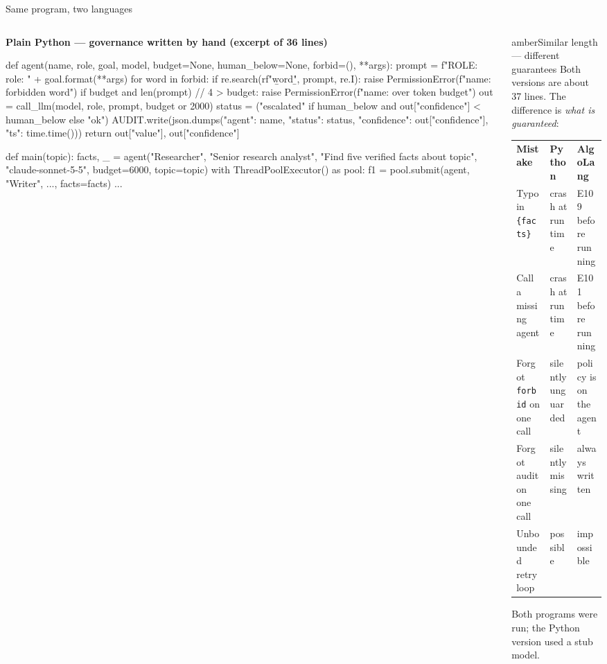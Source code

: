 \documentclass[aspectratio=169,11pt]{beamer}
\begin{document}
\begin{frame}[fragile]{Same program, two languages}
\begin{columns}[T]
\begin{column}{0.53\textwidth}
{\scriptsize\bfseries\color{muted} Plain Python — governance written by hand (excerpt of 36 lines)}
\begin{pycode}[listing options={style=py,basicstyle=\ttfamily\fontsize{5.6}{6.6}\selectfont}]
def agent(name, role, goal, model, budget=None,
          human_below=None, forbid=(), **args):
    prompt = f"ROLE: {role}\nGOAL: " + goal.format(**args)
    for word in forbid:
        if re.search(rf"\b{word}\b", prompt, re.I):
            raise PermissionError(f"{name}: forbidden {word}")
    if budget and len(prompt) // 4 > budget:
        raise PermissionError(f"{name}: over token budget")
    out = call_llm(model, role, prompt, budget or 2000)
    status = ("escalated" if human_below and
              out["confidence"] < human_below else "ok")
    AUDIT.write(json.dumps({"agent": name, "status": status,
        "confidence": out["confidence"], "ts": time.time()}))
    return out["value"], out["confidence"]

def main(topic):
    facts, _ = agent("Researcher", "Senior research analyst",
        "Find five verified facts about {topic}",
        "claude-sonnet-5-5", budget=6000, topic=topic)
    with ThreadPoolExecutor() as pool:
        f1 = pool.submit(agent, "Writer", ..., facts=facts)
        ...
\end{pycode}
\end{column}
\begin{column}{0.44\textwidth}
\begin{card}{amber}{Similar length --- different guarantees}
Both versions are about 37 lines. The difference is \emph{what is guaranteed}:
\end{card}
\vspace{-1mm}
\renewcommand{\arraystretch}{1.2}
\tiny
\begin{tabular}{@{}p{26mm} p{14mm} p{14mm}@{}}
\rowcolor{navy}\color{white}\bfseries Mistake & \color{white}\bfseries Python & \color{white}\bfseries AlgoLang\\
Typo in \texttt{\{facts\}} & crash at run time & E109 before running\\
\rowcolor{black!3}Call a missing agent & crash at run time & E101 before running\\
Forgot \texttt{forbid} on one call & silently unguarded & policy is on the agent\\
\rowcolor{black!3}Forgot audit on one call & silently missing & always written\\
Unbounded retry loop & possible & impossible\\
\end{tabular}
\vspace{1mm}

{\tiny\color{muted} Both programs were run; the Python version used a stub model.}
\end{column}
\end{columns}
\end{frame}
\end{document}
